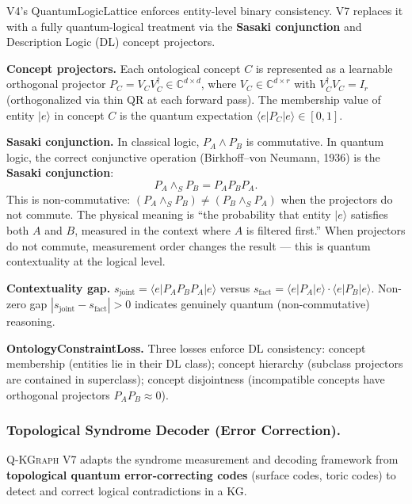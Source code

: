 \documentclass[runningheads]{llncs}
\newcommand{\QR}{\textsc{Q-KGraph}}
\newcommand{\CC}{\mathbb{C}}
\newcommand{\dagop}{^\dagger}
\newcommand{\ket}[1]{|#1\rangle}
\newcommand{\braket}[2]{\langle#1|#2\rangle}
\begin{document}
V4's QuantumLogicLattice enforces entity-level binary consistency.  V7
replaces it with a fully quantum-logical treatment via the
\textbf{Sasaki conjunction} and Description Logic (DL) concept projectors.

\textbf{Concept projectors.}
Each ontological concept $C$ is represented as a learnable orthogonal
projector $P_C=V_CV_C\dagop\in\CC^{d\times d}$, where
$V_C\in\CC^{d\times r}$ with $V_C\dagop V_C=I_r$ (orthogonalized via thin
QR at each forward pass).  The membership value of entity $\ket{e}$ in
concept $C$ is the quantum expectation $\braket{e}{P_C|e}\in[0,1]$.

\textbf{Sasaki conjunction.}
In classical logic, $P_A\wedge P_B$ is commutative.  In quantum logic, the
correct conjunctive operation (Birkhoff--von Neumann, 1936) is the
\textbf{Sasaki conjunction}:
\[
  P_A\wedge_S P_B = P_A P_B P_A.
\]
This is non-commutative: $(P_A\wedge_S P_B)\neq(P_B\wedge_S P_A)$ when the
projectors do not commute.  The physical meaning is ``the probability that
entity $\ket{e}$ satisfies both $A$ and $B$, measured in the context where
$A$ is filtered first.''  When projectors do not commute, measurement order
changes the result --- this is quantum contextuality at the logical level.

\textbf{Contextuality gap.}
$s_\text{joint}=\braket{e}{P_AP_BP_A|e}$ versus
$s_\text{fact}=\braket{e}{P_A|e}\cdot\braket{e}{P_B|e}$.
Non-zero gap $|s_\text{joint}-s_\text{fact}|>0$ indicates genuinely quantum
(non-commutative) reasoning.

\textbf{OntologyConstraintLoss.}
Three losses enforce DL consistency: concept membership (entities lie in
their DL class); concept hierarchy (subclass projectors are contained in
superclass); concept disjointness (incompatible concepts have orthogonal
projectors $P_AP_B\approx 0$).

\subsubsection{Topological Syndrome Decoder (Error Correction).}
\label{sec:ecc}

\QR{} V7 adapts the syndrome measurement and decoding framework from
\textbf{topological quantum error-correcting codes} (surface codes, toric
codes) to detect and correct logical contradictions in a KG.
\end{document}
